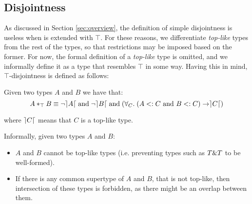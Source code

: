 
\subsection{Disjointness} 
As discussed in Section \ref{sec:overview}, the definition of
simple disjointness is useless when \name is extended with $\top$.
For these reasons, we differentiate \emph{top-like} types from the rest of the types,
so that restrictions may be imposed based on the former.
For now, the formal definition of a \emph{top-like} type is omitted,
and we informally define it as a type that resembles $\top$ in some way. 
Having this in mind, $\top$-disjointness is defined as follows:
\begin{definition}
Given two types $A$ and $B$ we have that:
\[A *_{\top} B \equiv \neg \rceil A \lceil \; \text{and} \; \neg \rceil B \lceil \; \text{and} \; 
(\forall_C. \; ( A <: C~\text{and}~B <: C ) \rightarrow \rceil C \lceil) \]

\noindent where $\rceil C \lceil$ means that $C$ is a top-like type.
\end{definition}

\noindent Informally, given two
types $A$ and $B$:
\begin{itemize}
\item $A$ and $B$ cannot be top-like types (i.e. preventing types such as $T \& T$ to be well-formed).
\item If there is any common supertype of $A$ and $B$, that is not top-like, then 
intersection of these types is forbidden, as there might be an overlap between them.
\end{itemize}

